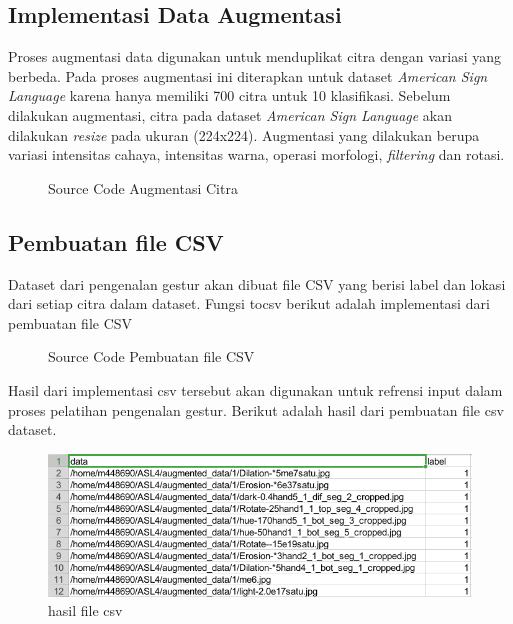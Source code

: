 \subsection{Implementasi Data Augmentasi}
Proses augmentasi data digunakan untuk menduplikat citra dengan variasi yang berbeda. Pada proses augmentasi ini diterapkan untuk dataset \textit{American Sign Language} karena hanya memiliki 700 citra untuk 10 klasifikasi. Sebelum dilakukan augmentasi, citra pada dataset \textit{American Sign Language} akan dilakukan \textit{resize} pada ukuran (224x224). Augmentasi yang dilakukan berupa variasi intensitas cahaya, intensitas warna, operasi morfologi, \textit{filtering} dan rotasi.
\begin{figure}[H]
	\centering
	
	\caption{Source Code Augmentasi Citra}
\end{figure}
\subsection{Pembuatan file CSV}
Dataset dari pengenalan gestur akan dibuat file CSV yang berisi label dan lokasi dari setiap citra dalam dataset. Fungsi tocsv berikut adalah implementasi dari pembuatan file CSV
\begin{figure}[H]
	\centering
	
	\caption{Source Code Pembuatan file CSV}
\end{figure}
Hasil dari implementasi csv tersebut akan digunakan untuk refrensi input dalam proses pelatihan pengenalan gestur. Berikut adalah hasil dari pembuatan file csv dataset.
\begin{figure}[H]
	\centering
	\includegraphics[width=0.7\linewidth]{csv}
	\caption{hasil file csv}
	\label{fig:csv}
\end{figure}
